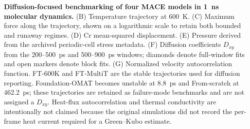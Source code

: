 \caption{\textbf{Diffusion-focused benchmarking of four MACE models in 1~ns molecular dynamics.} (B) Temperature trajectory at 600~K. (C) Maximum force along the trajectory, shown on a logarithmic scale to retain both bounded and runaway regimes. (D) Cr mean-squared displacement. (E) Pressure derived from the archived periodic-cell stress metadata. (F) Diffusion coefficients $D_{xy}$ from the 200--500~ps and 500--900~ps windows; diamonds denote full-window fits and open markers denote block fits. (G) Normalized velocity autocorrelation function. FT-600K and FT-MultiT are the stable trajectories used for diffusion reporting. Foundation-OMAT becomes unstable at 8.8~ps and From-scratch at 462.2~ps; these trajectories are retained as failure-mode benchmarks and are not assigned a $D_{xy}$. Heat-flux autocorrelation and thermal conductivity are intentionally not claimed because the original simulations did not record the per-frame heat current required for a Green--Kubo estimate.}
\label{fig:mace_1ns_diffusion_benchmark}

